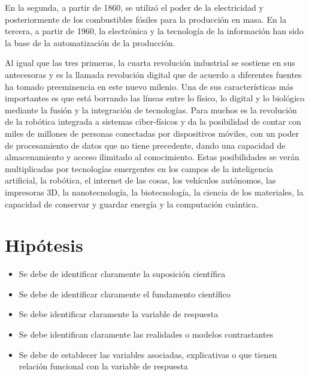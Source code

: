     En la segunda, a partir de 1860, se utilizó el poder de la
    electricidad y posteriormente de los combustibles fósiles para la producción en masa. En la tercera, a partir de 1960, la electrónica y la tecnología de la información han sido la base de la automatización de la producción.
    
    Al igual que las tres primeras, la cuarta revolución industrial se sostiene en sus antecesoras y es la llamada revolución digital que de acuerdo a diferentes fuentes ha tomado preeminencia en este nuevo milenio. Una de sus características más importantes es que está borrando las líneas entre lo físico, lo digital y lo biológico mediante la fusión y la integración de tecnologías. Para muchos es la revolución de la robótica integrada a sistemas ciber-físicos y da la posibilidad de contar con miles de millones de personas conectadas por dispositivos móviles, con un poder de procesamiento de datos que no tiene precedente, dando una capacidad de almacenamiento y acceso ilimitado al conocimiento. Estas posibilidades se verán multiplicadas por tecnologías emergentes en los campos de la inteligencia artificial, la robótica, el internet de las cosas, los vehículos autónomos, las impresoras 3D, la nanotecnología, la biotecnología, la ciencia de los materiales, la capacidad de conservar y guardar energía y la computación cuántica.
    
    
    
    \section{Hipótesis}
    
    
    \begin{itemize}
        \item Se debe de identificar claramente la suposición científica
        \item Se debe de identificar claramente el fundamento científico
        \item Se debe identificar claramente la variable de respuesta
        \item Se debe identifican claramente las realidades o modelos contrastantes
        \item Se debe de establecer las variables asociadas, explicativas o que tienen relación funcional con la variable de respuesta
    \end{itemize}
